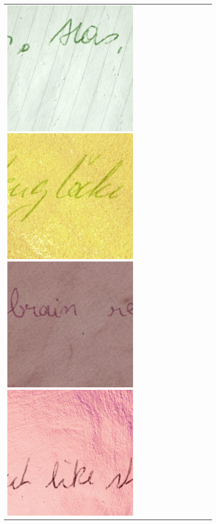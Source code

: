 \begin{figure}
\begin{tabular}{lc}
{  \includegraphics[scale=0.18]{../assets/background_style_transfer/spade/style/46.png}%
  \includegraphics[scale=0.18]{../assets/background_style_transfer/spade/style/49.png}%
  \includegraphics[scale=0.18]{../assets/background_style_transfer/spade/style/31.png}%
  \includegraphics[scale=0.18]{../assets/background_style_transfer/spade/style/74.png}%
}
\end{tabular}
\end{figure}
